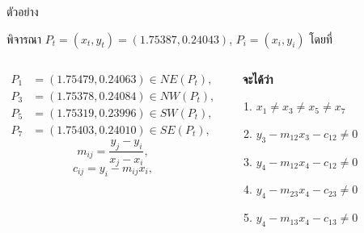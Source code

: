 \documentclass[12pt,aspectratio=169]{beamer}
\begin{document}
\begin{frame}{ตัวอย่าง}

พิจารณา $P_t = (x_t,y_t) =  (1.75387, 0.24043)$, $P_i = (x_i, y_i)$ โดยที่
\begin{columns}
\begin{align*}
P_1 & = (1.75479, 0.24063) \in NE(P_t), \\ 
P_3 & = (1.75378, 0.24084) \in NW(P_t),\\
P_5 & = (1.75319, 0.23996) \in SW(P_t),\\
P_7 & = (1.75403, 0.24010)  \in SE(P_t), 
\end{align*}
\[m_{ij} = \dfrac{y_j-y_i}{x_j-x_i}, \]
\[c_{ij} = y_i - m_{ij}x_i,\]    
\begin{block}{}\
\textbf{จะได้ว่า} 
\begin{enumerate}
    \item $x_1 \neq x_3 \neq x_5 \neq x_7$
    \item $y_3 - m_{12}x_3 - c_{12} \neq 0$
    \item $y_4 - m_{12}x_4 - c_{12} \neq 0$
    \item $y_4 - m_{23}x_4 - c_{23} \neq 0$
    \item $y_4 - m_{13}x_4 - c_{13} \neq 0$
\end{enumerate}     
\end{block} 
\end{columns}


\end{frame}
\end{document}
